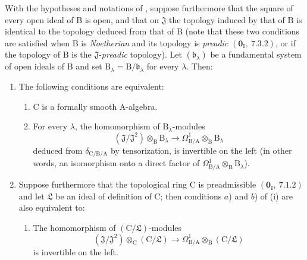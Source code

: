 \begin{corollary}[22.6.2]
\label{0.22.6.2}
With the hypotheses and notations of , suppose furthermore
that the square of every open ideal of $\mathrm{B}$ is open, and that on
$\mathfrak{J}$ the topology induced by that of $\mathrm{B}$ is identical to
the topology deduced from that of $\mathrm{B}$  \textup{(note that these
two conditions are satisfied when $\mathrm{B}$ is \emph{Noetherian} and its topology
is \emph{preadic} $(\mathbf{0}_\mathrm{I},~7.3.2)$, or if the topology of $\mathrm{B}$
is the $\mathfrak{J}$-\emph{preadic} topology)}. Let $(\mathfrak{b}_\lambda)$ be a
fundamental system of open ideals of $\mathrm{B}$ and set
$\mathrm{B}_\lambda=\mathrm{B}/\mathfrak{b}_\lambda$ for every $\lambda$.
Then:
\begin{enumerate}
  \item[\rm{(i)}] The following conditions are equivalent:
  \begin{enumerate}
    \item[\textup{a)}] $\mathrm{C}$ is a formally smooth $\mathrm{A}$-algebra.
    \item[\textup{b)}] For every $\lambda$, the homomorphism of
    $\mathrm{B}_\lambda$-modules
    \[
    \label{0.22.6.2.1}
      (\mathfrak{J}/\mathfrak{J}^2)\otimes_\mathrm{B}\mathrm{B}_\lambda
      \longrightarrow
      \Omega^1_{\mathrm{B}/\mathrm{A}}\otimes_\mathrm{B}\mathrm{B}_\lambda
      \tag{22.6.2.1}
    \]
    deduced from $\delta_{\mathrm{C}/\mathrm{B}/\mathrm{A}}$ by tensorization,
    is invertible on the left \textup{(in other words, an isomorphism onto a direct
    factor of
    $\Omega^1_{\mathrm{B}/\mathrm{A}}\otimes_\mathrm{B}\mathrm{B}_\lambda$)}.
  \end{enumerate}
  \item[\rm{(ii)}] Suppose furthermore that the topological ring $\mathrm{C}$
  is preadmissible $(\mathbf{0}_\mathrm{I},~7.1.2)$ and
  let $\mathfrak{L}$ be an ideal of definition of $\mathrm{C}$; then
  conditions \textup{$a$)} and \textup{$b$)} of \textup{(i)} are also equivalent to:
  \begin{enumerate}
    \item[\textup{c)}] The homomorphism of $(\mathrm{C}/\mathfrak{L})$-modules
    \[
      (\mathfrak{J}/\mathfrak{J}^2)\otimes_\mathrm{C}
      (\mathrm{C}/\mathfrak{L})\longrightarrow
      \Omega^1_{\mathrm{B}/\mathrm{A}}\otimes_\mathrm{B}
      (\mathrm{C}/\mathfrak{L})
    \]
    is invertible on the left.
  \end{enumerate}
\end{enumerate}
\end{corollary}

